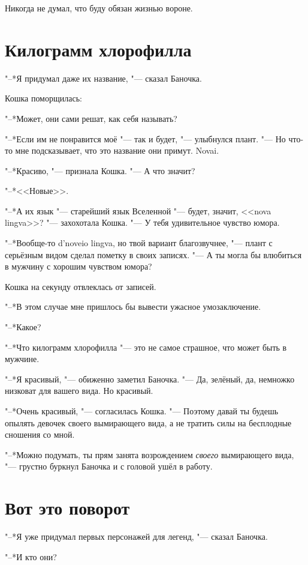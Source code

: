 \documentclass[a4paper,10pt]{book}
\begin{document}
Никогда не думал, что буду обязан жизнью вороне.

\section{Килограмм хлорофилла}

"--*Я придумал даже их название, "--- сказал Баночка.

Кошка поморщилась:

"--*Может, они сами решат, как себя называть?

"--*Если им не понравится моё "--- так и будет, "--- улыбнулся плант. "--- Но 
что-то мне подсказывает, что это название они примут. Novai.

"--*Красиво, "--- признала Кошка. "--- А что значит?

"--*<<Новые>>.

"--*А их язык "--- старейший язык Вселенной "--- будет, значит, <<nova 
lingva>>? "--- захохотала Кошка. "--- У тебя удивительное чувство юмора.

"--*Вообще-то d'noveio lingva, но твой вариант благозвучнее, "--- плант с 
серьёзным видом сделал пометку в своих записях. "--- А ты могла бы влюбиться в 
мужчину с хорошим чувством юмора?

Кошка на секунду отвлеклась от записей.

"--*В этом случае мне пришлось бы вывести ужасное умозаключение.

"--*Какое?

"--*Что килограмм хлорофилла "--- это не самое страшное, что может быть в 
мужчине.

"--*Я красивый, "--- обиженно заметил Баночка. "--- Да, зелёный, да, немножко 
низковат для вашего вида. Но красивый.

"--*Очень красивый, "--- согласилась Кошка. "--- Поэтому давай ты будешь 
опылять девочек своего вымирающего вида, а не тратить силы на бесплодные 
сношения со мной.

"--*Можно подумать, ты прям занята возрождением \textit{своего} вымирающего 
вида, "--- грустно буркнул Баночка и с головой ушёл в работу.

\section{Вот это поворот}


"--*Я уже придумал первых персонажей для легенд, "--- сказал Баночка.

"--*И кто они?
\end{document}
